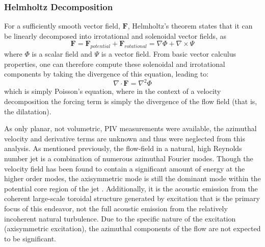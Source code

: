 \subsubsection{Helmholtz Decomposition}
For a sufficiently smooth vector field, $\mathbf{F}$, Helmholtz's theorem states that it can be linearly decomposed into irrotational and solenoidal vector fields, as
\begin{equation}
\mathbf{F} = \mathbf{F}_{potential} + \mathbf{F}_{rotational} = \nabla \Phi + \nabla \times \Psi
\end{equation}
where $\Phi$ is a scalar field and $\Psi$ is a vector field.
From basic vector calculus properties, one can therefore compute these solenoidal and irrotational components by taking the divergence of this equation, leading to:
\begin{equation}
\nabla \cdot \mathbf{F} = \nabla^{2} \Phi
\end{equation}
which is simply Poisson's equation, where in the context of a velocity decomposition the forcing term is simply the divergence of the flow field (that is, the dilatation).

As only planar, not volumetric, PIV measurements were available, the azimuthal velocity and derivative terms are unknown and thus were neglected from this analysis.
As mentioned previously, the flow-field in a natural, high Reynolds number jet is a combination of numerous azimuthal Fourier modes.
Though the velocity field has been found to contain a significant amount of energy at the higher order modes, the axisymmetric mode is still the dominant mode within the potential core region of the jet \citep{Glauser1987}.
Additionally, it is the acoustic emission from the coherent large-scale toroidal structure generated by excitation that is the primary focus of this endeavor, not the full acoustic emission from the relatively incoherent natural turbulence.
Due to the specific nature of the excitation (axisymmetric excitation), the azimuthal components of the flow are not expected to be significant.


